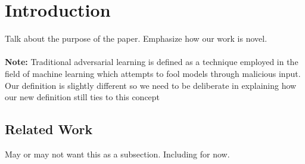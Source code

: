 \begin{abstract}
We present a novel machine learning framework which we apply here to uncover weaknesses in hash functions. Our framework extends the definition of adversarial learning to the domain of cryptographic systems. In this paper, we uncover weaknesses in Merkle{\textendash}Damg\r{a}rd structured hash functions, which include MD5, SHA-1 and SHA-2 and are critical components of cryptographic systems such as key exchange, digital signatures, and password and file verification. Most attacks against these hash functions leverage properties of the particular function. We develop a broader framework of adversarial learning to probabilistically determine how a hash function differs from its ideal state. We show the efficacy of our framework by theoretically and empirically discovering known vulnerabilities in MD5 and discuss how our method can be applied to uncovering potential unknown weaknesses in other hash functions in the Merkle{\textendash}Damg\r{a}rd class.
\end{abstract}

\section{Introduction}

Talk about the purpose of the paper. Emphasize how our work is novel. 
\\
\\
\textbf{Note:} Traditional adversarial learning is defined as a technique employed in the field of machine learning which attempts to fool models through malicious input. Our definition is slightly different so we need to be deliberate in explaining how our new definition still ties to this concept

\subsection{Related Work}
May or may not want this as a subsection. Including for now. 

